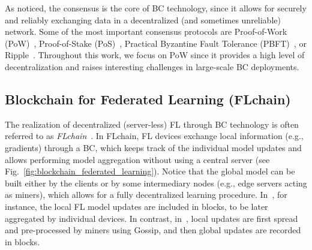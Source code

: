 \documentclass[10pt,journal,compsoc]{IEEEtran}
\begin{document}
As noticed, the consensus is the core of BC technology, since it allows for securely and reliably exchanging data in a decentralized (and sometimes unreliable) network. Some of the most important consensus protocols are Proof-of-Work (PoW)~\cite{nakamoto2019bitcoin}, Proof-of-Stake (PoS)~\cite{saleh2021blockchain}, Practical Byzantine Fault Tolerance (PBFT)~\cite{castro1999practical}, or Ripple~\cite{schwartz2014ripple}. Throughout this work, we focus on PoW since it provides a high level of decentralization and raises interesting challenges in large-scale BC deployments.

\subsection{Blockchain for Federated Learning (FLchain)}
\label{section:flchain}

The realization of decentralized (server-less) FL through BC technology is often referred to as \textit{FLchain}~\cite{majeed2019flchain,nguyen2021federated}. In FLchain, FL devices exchange local information (e.g., gradients) through a BC, which keeps track of the individual model updates and allows performing model aggregation without using a central server (see Fig.~\ref{fig:blockchain_federated_learning}). Notice that the global model can be built either by the clients or by some intermediary nodes (e.g., edge servers acting as miners), which allows for a fully decentralized learning procedure. In~\cite{kim2019blockchained}, for instance, the local FL model updates are included in blocks, to be later aggregated by individual devices. In contrast, in~\cite{ma2020federated}, local updates are first spread and pre-processed by miners using Gossip, and then global updates are recorded in blocks. %
\end{document}
